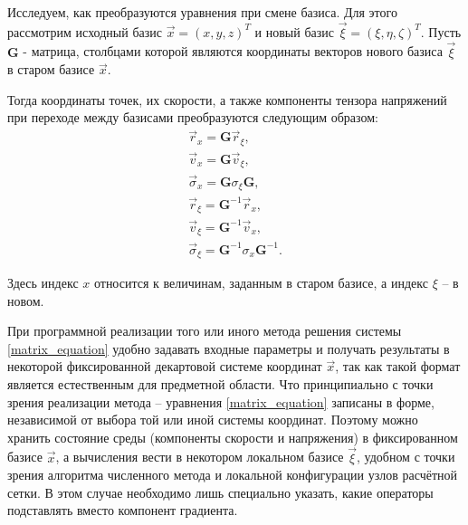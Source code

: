 Исследуем, как преобразуются уравнения при смене базиса. Для этого рассмотрим исходный базис $\vec x = (x, y, z)^T$ и новый базис $\vec \xi = (\xi, \eta, \zeta)^T$. Пусть $\mathbf G$ - матрица, столбцами которой являются координаты векторов нового базиса $\vec \xi$ в старом базисе $\vec x$.

Тогда координаты точек, их скорости, а также компоненты тензора напряжений при переходе между базисами преобразуются следующим образом:
\begin{eqnarray}
\label{basis_change}
\vec r_x = \mathbf G \vec r_{\xi},
\nonumber\\
\vec v_x = \mathbf G \vec v_{\xi},
\nonumber\\
\vec \sigma_x = \mathbf G \sigma_{\xi} \mathbf G,
\nonumber\\
\vec r_{\xi} = {\mathbf G}^{-1} \vec r_x,
\nonumber\\
\vec v_{\xi} = {\mathbf G}^{-1} \vec v_x,
\nonumber\\
\vec \sigma_{\xi} = {\mathbf G}^{-1} \sigma_x {\mathbf G}^{-1}.
\end{eqnarray}

Здесь индекс $x$ относится к величинам, заданным в старом базисе, а индекс $\xi$ -- в новом.

При программной реализации того или иного метода решения системы \ref{matrix_equation} удобно задавать входные параметры и получать результаты в некоторой фиксированной декартовой системе координат $\vec x$, так как такой формат является естественным для предметной области. Что принципиально с точки зрения реализации метода -- уравнения \ref{matrix_equation} записаны в форме, независимой от выбора той или иной системы координат. Поэтому можно хранить состояние среды (компоненты скорости и напряжения) в фиксированном базисе $\vec x$, а вычисления вести в некотором локальном базисе $\vec \xi$, удобном с точки зрения алгоритма численного метода и локальной конфигурации узлов расчётной сетки. В этом случае необходимо лишь специально указать, какие операторы подставлять вместо компонент градиента.

